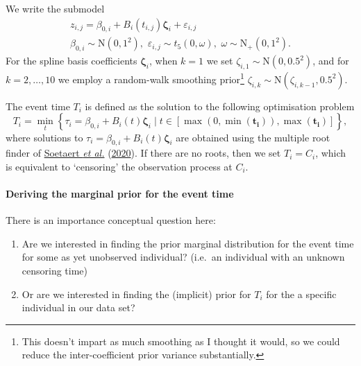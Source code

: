 \documentclass[
  10pt,
  a4paper,
]{article}
\providecommand{\tightlist}{%
  \setlength{\itemsep}{0pt}\setlength{\parskip}{0pt}}
\begin{document}
We write the submodel \begin{equation}
\begin{gathered}
  z_{i, j} = \beta_{0, i} + B_{i}(t_{i, j})\boldsymbol{\zeta}_{i} + \varepsilon_{i, j} \\
  \beta_{0, i} \sim \text{N}(0, 1^2), \,\, \varepsilon_{i, j} \sim t_{5}(0, \omega), \,\,  \omega \sim \text{N}_{+}(0, 1^2).
\end{gathered}
\end{equation} For the spline basis coefficients
\(\boldsymbol{\zeta}_{i}\), when \(k = 1\) we set
\(\zeta_{i, 1} \sim \text{N}(0, 0.5^2)\), and for \(k = 2, \ldots, 10\)
we employ a random-walk smoothing prior\footnote{This doesn't impart as
  much smoothing as I thought it would, so we could reduce the
  inter-coefficient prior variance substantially.}
\(\zeta_{i, k} \sim \text{N}(\zeta_{i, k - 1}, 0.5^2)\).

The event time \(T_{i}\) is defined as the solution to the following
optimisation problem \begin{equation}
  T_{i} = \min_{t} \left\{
    \tau_{i} = \beta_{0, i} + B_{i}(t)\boldsymbol{\zeta}_{i}
    \mid
    t \in [\max(0, \min(\boldsymbol{t_{i}})), \max(\boldsymbol{t_{i}})]
  \right\},
  \label{eqn:event_time_model_def}
\end{equation} where solutions to
\(\tau_{i} = \beta_{0, i} + B_{i}(t)\boldsymbol{\zeta}_{i}\) are
obtained using the multiple root finder of
\protect\hyperlink{ref-soetaert_rootsolve_2020}{Soetaert \emph{et al.}}
(\protect\hyperlink{ref-soetaert_rootsolve_2020}{2020}). If there are no
roots, then we set \(T_{i} = C_{i}\), which is equivalent to `censoring'
the observation process at \(C_{i}\).

\hypertarget{deriving-the-marginal-prior-for-the-event-time}{%
\paragraph{Deriving the marginal prior for the event
time}\label{deriving-the-marginal-prior-for-the-event-time}}

There is an importance conceptual question here:

\begin{enumerate}
\def\labelenumi{\arabic{enumi}.}
\tightlist
\item
  Are we interested in finding the prior marginal distribution for the
  event time for some as yet unobserved individual? (i.e.~an individual
  with an unknown censoring time)
\item
  Or are we interested in finding the (implicit) prior for \(T_{i}\) for
  the a specific individual in our data set?
\end{enumerate}
\end{document}
